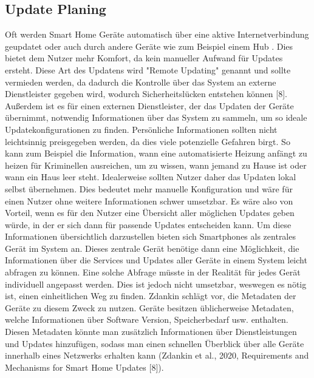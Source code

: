 \subsection{Update Planing}
Oft werden Smart Home Geräte automatisch über eine aktive Internetverbindung geupdatet oder auch durch andere
Geräte wie zum Beispiel einem Hub . Dies bietet dem Nutzer mehr Komfort, da kein manueller Aufwand für Updates ersteht.
Diese Art des Updatens wird "Remote Updating" genannt und sollte vermieden werden, da dadurch die Kontrolle über das System an
externe Dienstleister gegeben wird, wodurch Sicherheitslücken entstehen können [8].
Außerdem ist es für einen externen Dienstleister, der das Updaten der Geräte übernimmt, notwendig Informationen über das System zu sammeln,
um so ideale Updatekonfigurationen zu finden. Persönliche Informationen sollten nicht leichtsinnig preisgegeben werden, da dies viele
potenzielle Gefahren birgt. So kann zum Beispiel die Information, wann eine automatisierte Heizung anfängt zu heizen für Kriminellen ausreichen, um
zu wissen, wann jemand zu Hause ist oder wann ein Haus leer steht. 
Idealerweise sollten Nutzer daher das Updaten lokal selbst übernehmen. Dies bedeutet mehr manuelle Konfiguration
und wäre für einen Nutzer ohne weitere Informationen schwer umsetzbar.
Es wäre also von Vorteil, wenn es für den Nutzer
eine Übersicht aller möglichen Updates geben würde, in der er sich dann für passende Updates entscheiden kann.
Um diese Informationen übersichtlich darzustellen bieten sich Smartphones als zentrales Gerät im System an.
Dieses zentrale Gerät benötige dann
eine Möglichkeit, die Informationen über die Services und Updates aller Geräte in einem System leicht abfragen zu können.
Eine solche Abfrage müsste in der Realität für jedes Gerät individuell angepasst werden. Dies ist jedoch nicht umsetzbar,
weswegen es nötig ist, einen einheitlichen Weg zu finden.
Zdankin schlägt vor, die Metadaten der Geräte zu diesem Zweck zu nutzen. Geräte besitzen üblicherweise Metadaten, welche Informationen über 
Software Version, Speicherbedarf usw. enthalten. Diesen Metadaten könnte man zusätzlich Informationen über Dienstleistungen und Updates 
hinzufügen, sodass man einen schnellen Überblick über alle Geräte innerhalb eines Netzwerks erhalten kann
(Zdankin et al., 2020, Requirements and Mechanisms for Smart Home Updates [8]). 


